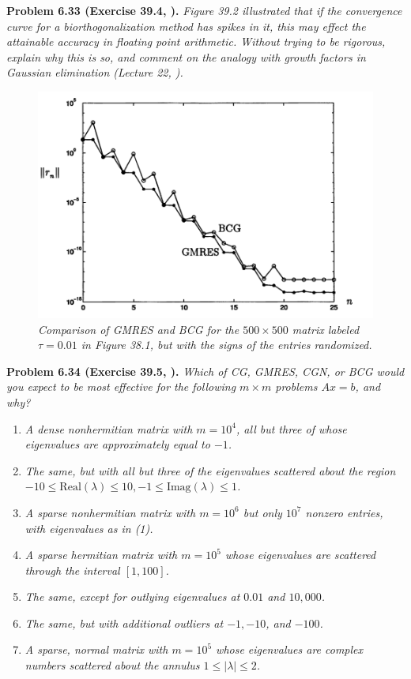 \documentclass[a4paper,oneside]{book}
\numberwithin{equation}{chapter}
\begin{document}
\textbf{Problem 6.33 (Exercise 39.4, \cite{1}).} \textit{Figure 39.2 illustrated that if the convergence curve for a biorthogonalization method has spikes in it, this may effect the attainable accuracy in floating point arithmetic. Without trying to be rigorous, explain why this is so, and comment on the analogy with growth factors in Gaussian elimination (Lecture 22, \cite{1}).}
\begin{figure}[H]
	\centering
	\includegraphics[scale=0.35]{15}
	\caption{\textit{Comparison of GMRES and BCG for the $500 \times 500$ matrix labeled $\tau =0.01$ in Figure 38.1, but with the signs of the entries randomized.}}
\end{figure}
\textbf{Problem 6.34 (Exercise 39.5, \cite{1}).} \textit{Which of CG, GMRES, CGN, or BCG would you expect to be most effective for the following $m\times m$ problems $Ax=b$, and why?}
\begin{enumerate}
\item \textit{A dense nonhermitian matrix with $m=10^4$, all but three of whose eigenvalues are approximately equal to $-1$.}
\item \textit{The same, but with all but three of the eigenvalues scattered about the region $-10\le \mbox{Real}\left(\lambda\right) \le 10,-1\le \mbox{Imag}\left(\lambda\right) \le 1$.}
\item \textit{A sparse nonhermitian matrix with $m=10^6$ but only $10^7$ nonzero entries, with eigenvalues as in (1).}
\item \textit{A sparse hermitian matrix with $m=10^5$ whose eigenvalues are scattered through the interval $\left[1,100\right]$.}
\item \textit{The same, except for outlying eigenvalues at $0.01$ and $10,000$.}
\item \textit{The same, but with additional outliers at $-1,-10$, and $-100$.}
\item \textit{A sparse, normal matrix with $m=10^5$ whose eigenvalues are complex numbers scattered about the annulus $1\le \left|\lambda \right|\le 2$.}
\end{enumerate}
\end{document}
